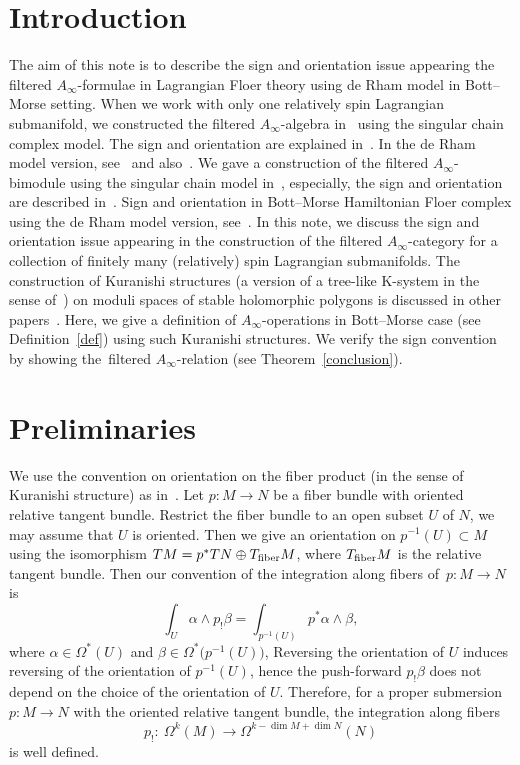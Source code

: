 \documentclass[pdftex]{sigma}
\numberwithin{equation}{section}
\theoremstyle{definition}
\begin{document}
\section{Introduction}
The aim of this note is to describe the sign and orientation issue appearing the filtered $A_{\infty}$-formulae in Lagrangian Floer theory
using de Rham model in Bott--Morse setting.
When we work with only one relatively spin Lagrangian submanifold,
we constructed the filtered $A_{\infty}$-algebra in~\cite{FOOO09I,FOOO09II} using the singular chain complex model.
The sign and orientation are explained in~\cite[Sections~8.3--8.5]{FOOO09II}.
In the de Rham model version, see~\cite[Section~22.4]{FOOO20} and also~\cite{ST}.
We gave a construction of the filtered $A_{\infty}$-bimodule using the singular chain model in~\mbox{\cite{FOOO09I,FOOO09II}}, especially,
the sign and orientation are described in~\cite[Section~8.8]{FOOO09II}.
Sign and orientation in Bott--Morse Hamiltonian Floer complex using the de Rham model version, see~\cite[Definition~19.3 and Proposition~19.5]{FOOO20}.
In this note, we discuss the sign and orientation issue appearing in the construction of the filtered $A_{\infty}$-category for a collection of finitely many
(relatively) spin Lagrangian submanifolds.
The construction of Kuranishi structures (a version of a tree-like K-system in the sense of~\cite{FOOO20}) on moduli spaces
of stable holomorphic polygons is discussed
in other papers~\cite{AFOOO,F}.
Here, we give a definition of $A_{\infty}$-operations in Bott--Morse case (see Definition~\ref{def}) using such Kuranishi structures.
We verify the sign convention by showing the~filtered $A_{\infty}$-relation (see Theorem~\ref{conclusion}).


\section{Preliminaries}
We use the convention on orientation on the fiber product (in the sense of Kuranishi structure) as in~\cite[Section 8.2]{FOOO09II}.
Let $p\colon M \to N$ be a fiber bundle with oriented relative tangent bundle.
Restrict the fiber bundle to an open subset $U$ of $N$, we may assume that $U$ is oriented.
Then we give an orientation on $p^{-1}(U) \subset M$ using the isomorphism
$TM = p^* TN \oplus T_{\rm fiber} M$, where $T_{\rm fiber}M$ is the relative tangent bundle.
Then our convention of the integration along fibers of~${p\colon M \to N}$ is
\begin{equation*} %
\int_U \alpha \wedge p_! \beta = \int_{p^{-1}(U)} p^* \alpha \wedge \beta, \nonumber
\end{equation*}
where $\alpha \in \Omega^*(U)$ and $\beta \in \Omega^*\bigl(p^{-1}(U)\bigr)$,
Reversing the orientation of $U$ induces reversing of the orientation of $p^{-1}(U)$, hence the push-forward $p_! \beta$ does not depend on
the choice of the orientation of $U$.
Therefore, for a proper submersion $p\colon M \to N$ with the oriented relative tangent bundle, the integration along fibers
\[
p_!\colon \ \Omega^k(M) \to \Omega^{k-\dim M + \dim N}(N)
\]
is well defined.
\end{document}
